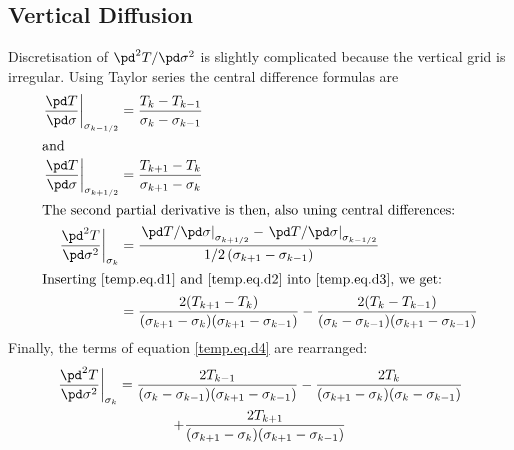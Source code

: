 \subsection{Vertical Diffusion}
Discretisation of $\pd^2T/\pd\sigma^2$ is slightly complicated because the vertical grid is irregular. Using Taylor series the central difference formulas are
\begin{subequations}
  \begin{align}
    \label{temp.eq.d1}
    \left.\frac{\pd T}{\pd\sigma}\right|_{\sigma_{k-1/2}}&=\frac{T_k-T_{k-1}}{\sigma_k-\sigma_{k-1}}\\
    \intertext{and}
    \label{temp.eq.d2}
    \left.\frac{\pd T}{\pd\sigma}\right|_{\sigma_{k+1/2}}&=\frac{T_{k+1}-T_k}{\sigma_{k+1}-\sigma_k}\\
    \intertext{The second partial derivative is then, also uning central differences:}
    \label{temp.eq.d3}
    \left.\frac{\pd^2 T}{\pd\sigma^2}\right|_{\sigma_k} &= \frac{\left.{\pd T}/{\pd\sigma}\right|_{\sigma_{k+1/2}} - \left.{\pd T}/{\pd\sigma}\right|_{\sigma_{k-1/2}}}{1/2\left(\sigma_{k+1}-\sigma_{k-1}\right)}\\
    \intertext{Inserting \eqref{temp.eq.d1} and \eqref{temp.eq.d2} into \eqref{temp.eq.d3}, we get:}
    \label{temp.eq.d4}
    &=\frac{2(T_{k+1}-T_k)}{(\sigma_{k+1}-\sigma_k)(\sigma_{k+1}-\sigma_{k-1})}-\frac{2(T_k-T_{k-1})}{(\sigma_k-\sigma_{k-1})(\sigma_{k+1}-\sigma_{k-1})}
  \end{align}
\end{subequations}
Finally, the terms of equation \eqref{temp.eq.d4} are rearranged:
\begin{multline}
  \label{temp.eq.dsigma2}
  \left.\frac{\pd^2 T}{\pd\sigma^2}\right|_{\sigma_k} = \frac{2T_{k-1}}{(\sigma_k-\sigma_{k-1})(\sigma_{k+1}-\sigma_{k-1})} - \frac{2T_k}{(\sigma_{k+1}-\sigma_k)(\sigma_k-\sigma_{k-1})}\\
  + \frac{2T_{k+1}}{(\sigma_{k+1}-\sigma_k)(\sigma_{k+1}-\sigma_{k-1})}
\end{multline}


